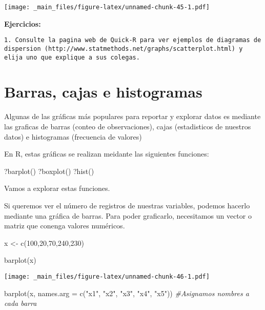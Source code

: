 \documentclass[
]{book}
\newenvironment{Shaded}{\begin{snugshade}}{\end{snugshade}}
\newcommand{\AttributeTok}[1]{\textcolor[rgb]{0.77,0.63,0.00}{#1}}
\newcommand{\CommentTok}[1]{\textcolor[rgb]{0.56,0.35,0.01}{\textit{#1}}}
\newcommand{\DecValTok}[1]{\textcolor[rgb]{0.00,0.00,0.81}{#1}}
\newcommand{\FunctionTok}[1]{\textcolor[rgb]{0.00,0.00,0.00}{#1}}
\newcommand{\NormalTok}[1]{#1}
\newcommand{\OtherTok}[1]{\textcolor[rgb]{0.56,0.35,0.01}{#1}}
\newcommand{\StringTok}[1]{\textcolor[rgb]{0.31,0.60,0.02}{#1}}
\begin{document}
\texttt{[image: \_main\_files/figure-latex/unnamed-chunk-45-1.pdf]}

\textbf{Ejercicios:}

\begin{verbatim}
1. Consulte la pagina web de Quick-R para ver ejemplos de diagramas de dispersion (http://www.statmethods.net/graphs/scatterplot.html) y elija uno que explique a sus colegas.
\end{verbatim}

\hypertarget{barras-cajas-e-histogramas}{%
\section{Barras, cajas e histogramas}\label{barras-cajas-e-histogramas}}

Algunas de las gráficas más populares para reportar y explorar datos es mediante las graficas de barras (conteo de observaciones), cajas (estadisticos de nuestros datos) e histogramas (frecuencia de valores)

En R, estas gráficas se realizan meidante las siguientes funciones:

?barplot()
?boxplot()
?hist()

Vamos a explorar estas funciones.

Si queremos ver el número de registros de nuestras variables, podemos hacerlo mediante una gráfica de barras. Para poder graficarlo, necesitamos un vector o matriz que conenga valores numéricos.

\begin{Shaded}
\begin{Highlighting}[]
\NormalTok{x }\OtherTok{\textless{}{-}} \FunctionTok{c}\NormalTok{(}\DecValTok{100}\NormalTok{,}\DecValTok{20}\NormalTok{,}\DecValTok{70}\NormalTok{,}\DecValTok{240}\NormalTok{,}\DecValTok{230}\NormalTok{)}

\FunctionTok{barplot}\NormalTok{(x)}
\end{Highlighting}
\end{Shaded}

\texttt{[image: \_main\_files/figure-latex/unnamed-chunk-46-1.pdf]}

\begin{Shaded}
\begin{Highlighting}[]
\FunctionTok{barplot}\NormalTok{(x, }\AttributeTok{names.arg =} \FunctionTok{c}\NormalTok{(}\StringTok{"x1"}\NormalTok{, }\StringTok{"x2"}\NormalTok{, }\StringTok{"x3"}\NormalTok{, }\StringTok{"x4"}\NormalTok{, }\StringTok{"x5"}\NormalTok{)) }\CommentTok{\#Asignamos nombres a cada barra}
\end{Highlighting}
\end{Shaded}
\end{document}

